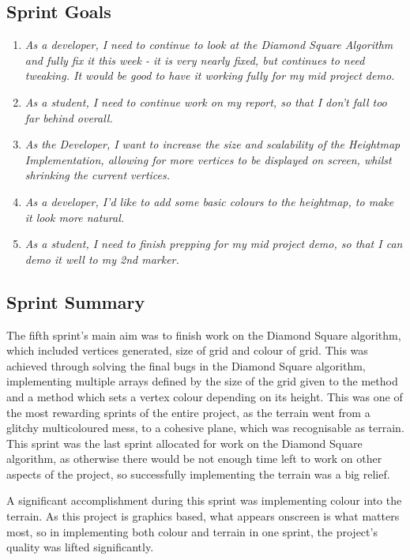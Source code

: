 \documentclass[a4paper,10pt]{report}
\begin{document}
\subsection{Sprint Goals}

\begin{enumerate}
    \item \textit{As a developer, I need to continue to look at the Diamond Square Algorithm and fully fix it this week - it is very nearly fixed, but continues to need tweaking. It would be good to have it working fully for my mid project demo. }
    \item \textit{As a student, I need to continue work on my report, so that I don't fall too far behind overall.}
    \item \textit{As the Developer, I want to increase the size and scalability of the Heightmap Implementation, allowing for more vertices to be displayed on screen, whilst shrinking the current vertices. }
    \item \textit{As a developer, I'd like to add some basic colours to the heightmap, to make it look more natural.}
    \item \textit{As a student, I need to finish prepping for my mid project demo, so that I can demo it well to my 2nd marker. }
    
\end{enumerate}
\subsection{Sprint Summary}

The fifth sprint's main aim was to finish work on the Diamond Square algorithm, which included vertices generated, size of grid and colour of grid. This was achieved through solving the final bugs in the Diamond Square algorithm, implementing multiple arrays defined by the size of the grid given to the method and a method which sets a vertex colour depending on its height. This was one of the most rewarding sprints of the entire project, as the terrain went from a glitchy multicoloured mess, to a cohesive plane, which was recognisable as terrain. This sprint was the last sprint allocated for work on the Diamond Square algorithm, as otherwise there would be not enough time left to work on other aspects of the project, so successfully implementing the terrain was a big relief. \medskip

A significant accomplishment during this sprint was implementing colour into the terrain. As this project is graphics based, what appears onscreen is what matters most, so in implementing both colour and terrain in one sprint, the project's quality was lifted significantly.
\end{document}
